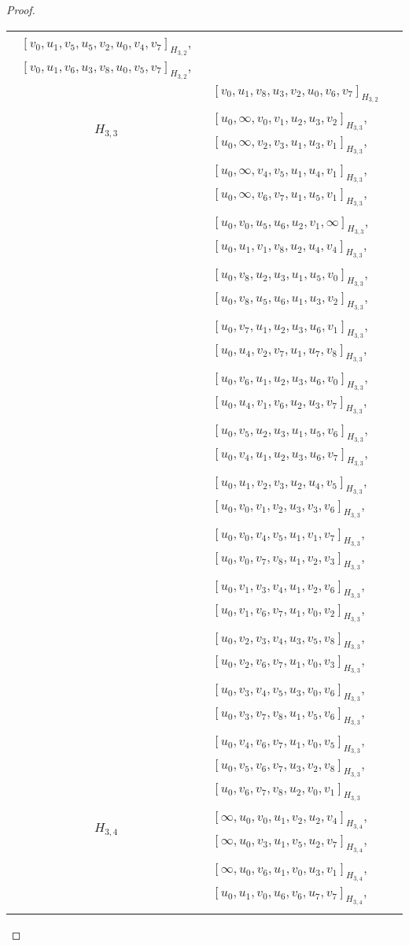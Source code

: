 \begin{subappendices}
\begin{proof}
{\begin{longtable}{|c|l|}
  $[v_0, u_1, v_5, u_5, v_2, u_0, v_4, v_7]_{H_{3,2}}$,
  $[v_0, u_1, v_6, u_3, v_8, u_0, v_5, v_7]_{H_{3,2}}$, \\* &
  $[v_0, u_1, v_8, u_3, v_2, u_0, v_6, v_7]_{H_{3,2}}$
\\ \hline
$H_{3,3}$ &
  $[u_0, \infty, v_0, v_1, u_2, u_3, v_2]_{H_{3,3}}$,
  $[u_0, \infty, v_2, v_3, u_1, u_3, v_1]_{H_{3,3}}$, \\* &
  $[u_0, \infty, v_4, v_5, u_1, u_4, v_1]_{H_{3,3}}$,
  $[u_0, \infty, v_6, v_7, u_1, u_5, v_1]_{H_{3,3}}$, \\* &
  $[u_0, v_0, u_5, u_6, u_2, v_1, \infty]_{H_{3,3}}$,
  $[u_0, u_1, v_1, v_8, u_2, u_4, v_4]_{H_{3,3}}$, \\* &
  $[u_0, v_8, u_2, u_3, u_1, u_5, v_0]_{H_{3,3}}$,
  $[u_0, v_8, u_5, u_6, u_1, u_3, v_2]_{H_{3,3}}$, \\* &
  $[u_0, v_7, u_1, u_2, u_3, u_6, v_1]_{H_{3,3}}$,
  $[u_0, u_4, v_2, v_7, u_1, u_7, v_8]_{H_{3,3}}$, \\* &
  $[u_0, v_6, u_1, u_2, u_3, u_6, v_0]_{H_{3,3}}$,
  $[u_0, u_4, v_1, v_6, u_2, u_3, v_7]_{H_{3,3}}$, \\* &
  $[u_0, v_5, u_2, u_3, u_1, u_5, v_6]_{H_{3,3}}$,
  $[u_0, v_4, u_1, u_2, u_3, u_6, v_7]_{H_{3,3}}$, \\* &
  $[u_0, u_1, v_2, v_3, u_2, u_4, v_5]_{H_{3,3}}$,
  $[u_0, v_0, v_1, v_2, u_3, v_3, v_6]_{H_{3,3}}$, \\* &
  $[u_0, v_0, v_4, v_5, u_1, v_1, v_7]_{H_{3,3}}$,
  $[u_0, v_0, v_7, v_8, u_1, v_2, v_3]_{H_{3,3}}$, \\* &
  $[u_0, v_1, v_3, v_4, u_1, v_2, v_6]_{H_{3,3}}$,
  $[u_0, v_1, v_6, v_7, u_1, v_0, v_2]_{H_{3,3}}$, \\* &
  $[u_0, v_2, v_3, v_4, u_3, v_5, v_8]_{H_{3,3}}$,
  $[u_0, v_2, v_6, v_7, u_1, v_0, v_3]_{H_{3,3}}$, \\* &
  $[u_0, v_3, v_4, v_5, u_3, v_0, v_6]_{H_{3,3}}$,
  $[u_0, v_3, v_7, v_8, u_1, v_5, v_6]_{H_{3,3}}$, \\* &
  $[u_0, v_4, v_6, v_7, u_1, v_0, v_5]_{H_{3,3}}$,
  $[u_0, v_5, v_6, v_7, u_3, v_2, v_8]_{H_{3,3}}$, \\* &
  $[u_0, v_6, v_7, v_8, u_2, v_0, v_1]_{H_{3,3}}$
\\ \hline
$H_{3,4}$ &
  $[\infty, u_0, v_0, u_1, v_2, u_2, v_4]_{H_{3,4}}$,
  $[\infty, u_0, v_3, u_1, v_5, u_2, v_7]_{H_{3,4}}$, \\* &
  $[\infty, u_0, v_6, u_1, v_0, u_3, v_1]_{H_{3,4}}$,
  $[u_0, u_1, v_0, u_6, v_6, u_7, v_7]_{H_{3,4}}$, \\* &

\end{longtable}}
\end{proof}
\end{subappendices}
